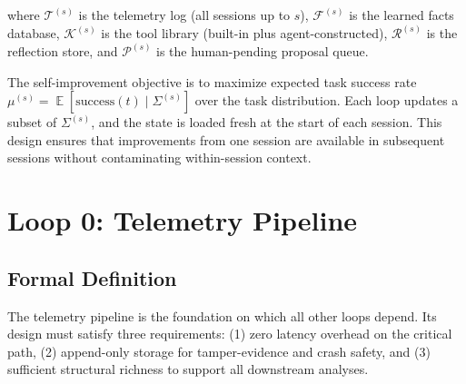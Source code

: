 \documentclass[11pt]{article}
\DeclareMathOperator{\E}{\mathbb{E}}
\begin{document}
where $\mathcal{T}^{(s)}$ is the telemetry log (all sessions up to $s$),
$\mathcal{F}^{(s)}$ is the learned facts database, $\mathcal{K}^{(s)}$ is the
tool library (built-in plus agent-constructed), $\mathcal{R}^{(s)}$ is the
reflection store, and $\mathcal{P}^{(s)}$ is the human-pending proposal queue.

The self-improvement objective is to maximize expected task success rate
$\mu^{(s)} = \E[\text{success}(t) \mid \Sigma^{(s)}]$ over the task distribution.
Each loop updates a subset of $\Sigma^{(s)}$, and the state is loaded fresh at
the start of each session. This design ensures that improvements from one session
are available in subsequent sessions without contaminating within-session context.

\section{Loop 0: Telemetry Pipeline}
\label{sec:loop0}

\subsection{Formal Definition}

The telemetry pipeline is the foundation on which all other loops depend. Its
design must satisfy three requirements: (1) zero latency overhead on the
critical path, (2) append-only storage for tamper-evidence and crash safety,
and (3) sufficient structural richness to support all downstream analyses.
\end{document}
